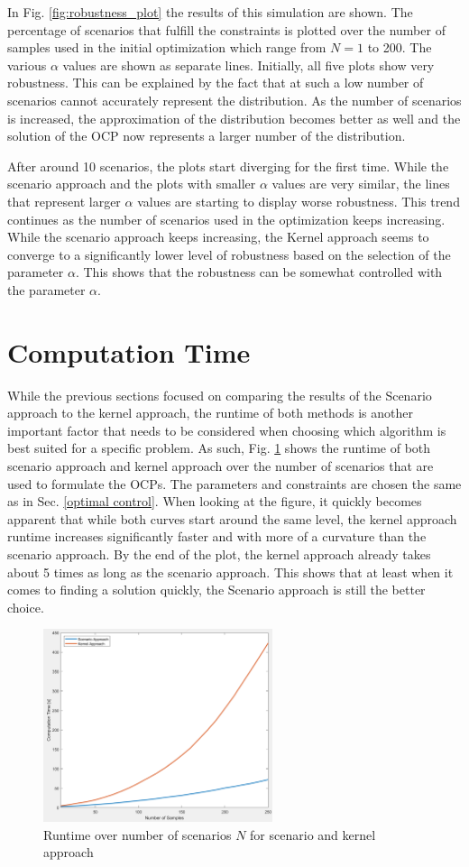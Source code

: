 In Fig. \ref{fig:robustness_plot} the results of this simulation are shown. The percentage of scenarios that fulfill the constraints is plotted over the number of samples used in the initial optimization which range from $N = 1$ to 200. The various $\alpha$ values are shown as separate lines. Initially, all five plots show very robustness. This can be explained by the fact that at such a low number of scenarios cannot accurately represent the distribution. As the number of scenarios is increased, the approximation of the distribution becomes better as well and the solution of the OCP now represents a larger number of the distribution. 

After around 10 scenarios, the plots start diverging for the first time. While the scenario approach and the plots with smaller $\alpha$ values are very similar, the lines that represent larger $\alpha$ values are starting to display worse robustness. This trend continues as the number of scenarios used in the optimization keeps increasing. While the scenario approach keeps increasing, the Kernel approach seems to converge to a significantly lower level of robustness based on the selection of the parameter $\alpha$. This shows that the robustness can be somewhat controlled with the parameter $\alpha$.

 

\section{Computation Time} \label{computation time}

While the previous sections focused on comparing the results of the Scenario approach to the kernel approach, the runtime of both methods is another important factor that needs to be considered when choosing which algorithm is best suited for a specific problem. As such, Fig. \ref{fig:runtime_plot} shows the runtime of both scenario approach and kernel approach over the number of scenarios that are used to formulate the OCPs. The parameters and constraints are chosen the same as in Sec. \ref{optimal control}. When looking at the figure, it quickly becomes apparent that while both curves start around the same level, the kernel approach runtime increases significantly faster and with more of a curvature than the scenario approach. By the end of the plot, the kernel approach already takes about 5 times as long as the scenario approach. This shows that at least when it comes to finding a solution quickly, the Scenario approach is still the better choice.

\begin{figure}[htb]
\centering
\includegraphics[width=0.6\textwidth]{pics/computationtime_plot.png}
\caption{Runtime over number of scenarios $N$ for scenario and kernel approach}
\label{fig:runtime_plot}
\end{figure}

